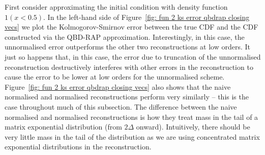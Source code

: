 First consider approximating the initial condition with density function \(1(x<0.5)\). In the left-hand side of Figure~\ref{fig: fun 2 ks error qbdrap closing vecs} we plot the Kolmogorov-Smirnov error between the true CDF and the CDF constructed via the QBD-RAP approximation. Interestingly, in this case, the unnormalised error outperforms the other two reconstructions at low orders. It just so happens that, in this case, the error due to truncation of the unnormalised reconstruction destructively interferes with other errors in the reconstruction to cause the error to be lower at low orders for the unnormalised scheme. Figure~\ref{fig: fun 2 ks error qbdrap closing vecs} also shows that the naive normalised and normalised reconstructions perform very similarly -- this is the case throughout much of this subsection. The difference between the naive normalised and normalised reconstructions is how they treat mass in the tail of a matrix exponential distribution (from \(2\Delta\) onward). Intuitively, there should be very little mass in the tail of the distribution as we are using concentrated matrix exponential distributions in the reconstruction. 

